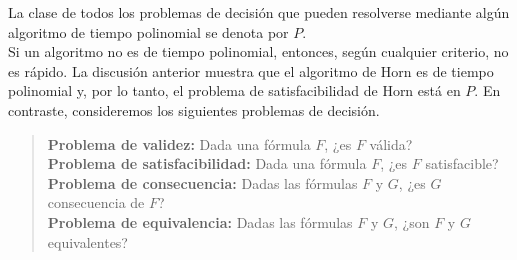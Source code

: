 \documentclass[12pt,a4paper]{book}
\begin{document}
    La clase de todos los problemas de decisión que pueden resolverse mediante algún algoritmo de tiempo polinomial se
    denota por $P$.\\
    Si un algoritmo no es de tiempo polinomial, entonces, según cualquier criterio, no es rápido. La discusión anterior
    muestra que el algoritmo de Horn es de tiempo polinomial y, por lo tanto, el problema de satisfacibilidad de Horn está en
    $P$. En contraste, consideremos los siguientes problemas de decisión.

    \begin{quote}
        \textbf{Problema de validez:} Dada una fórmula $F$, ¿es $F$ válida?\\
        \textbf{Problema de satisfacibilidad:} Dada una fórmula $F$, ¿es $F$ satisfacible?\\
        \textbf{Problema de consecuencia:} Dadas las fórmulas $F$ y $G$, ¿es $G$ consecuencia de $F$?\\
        \textbf{Problema de equivalencia:} Dadas las fórmulas $F$ y $G$, ¿son $F$ y $G$ equivalentes?
    \end{quote}
\end{document}
